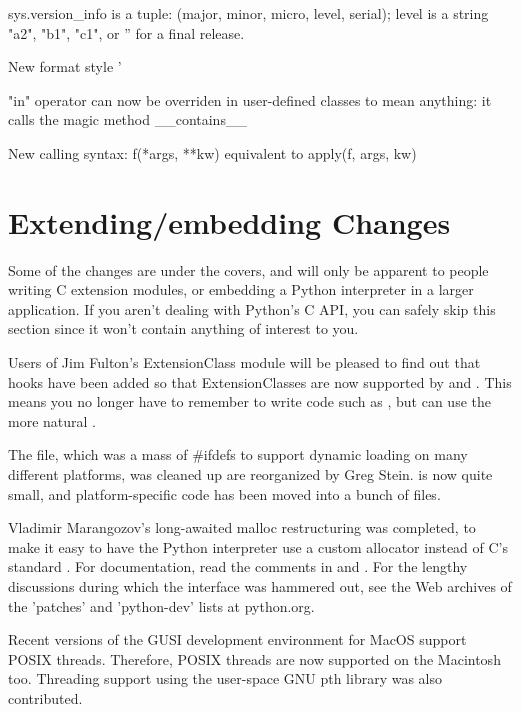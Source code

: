 \documentclass{howto}
\begin{document}
sys.version_info is a tuple: (major, minor, micro, level, serial); level
is a string "a2", "b1", "c1", or '' for a final release.

New format style '%

"in" operator can now be overriden in user-defined classes to mean anything:
it calls the magic method __contains__

New calling syntax: f(*args, **kw) equivalent to apply(f, args, kw)

\section{Extending/embedding Changes}

Some of the changes are under the covers, and will only be apparent to
people writing C extension modules, or embedding a Python interpreter
in a larger application.  If you aren't dealing with Python's C API,
you can safely skip this section since it won't contain anything of
interest to you.

Users of Jim Fulton's ExtensionClass module will be pleased to find
out that hooks have been added so that ExtensionClasses are now
supported by  and .
This means you no longer have to remember to write code such as
, but can use the more natural
.

The  file, which was a mass of #ifdefs to
support dynamic loading on many different platforms, was cleaned up
are reorganized by Greg Stein.   is now quite small,
and platform-specific code has been moved into a bunch of
 files.  

Vladimir Marangozov's long-awaited malloc restructuring was completed,
to make it easy to have the Python interpreter use a custom allocator
instead of C's standard .  For documentation, read
the comments in  and
.  For the lengthy discussions during which
the interface was hammered out, see the Web archives of the 'patches'
and 'python-dev' lists at python.org.

Recent versions of the GUSI %
development environment for MacOS support POSIX threads.  Therefore,
POSIX threads are now supported on the Macintosh too.  Threading
support using the user-space GNU pth library was also contributed.
\end{document}
